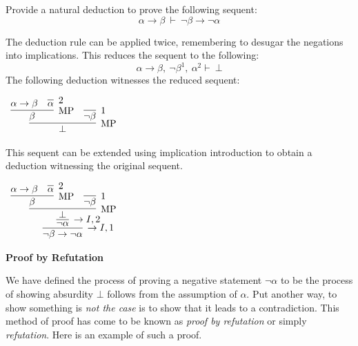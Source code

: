 \documentclass{book}
\begin{document}
    \begin{eg}[Contraposition]
        Provide a natural deduction to prove the following sequent: $$\alpha \to \beta \ \vdash \ \lnot\beta \to \lnot\alpha $$

        The deduction rule can be applied twice, remembering to desugar the negations into implications. This reduces the sequent to the following: $$\alpha \to \beta, \ \lnot\beta^{1}, \ \alpha^{2} \vdash \ \bot$$ The following deduction witnesses the reduced sequent: 

        \begin{center}
            $\begin{array}{c}
                \infer[\MP]{\bot}
                            {\infer[\MP]{\beta}
                                {\alpha \to \beta
                                &
                                \infer[2]{\alpha}{}}
                            &
                            \infer[1]{\lnot\beta}{}}
            \end{array}$
        \end{center}   
        
        This sequent can be extended using implication introduction to obtain a deduction witnessing the original sequent. 

        \begin{center}
            $\begin{array}{c}
                \infer[\to I,1]{\lnot\beta \to \lnot\alpha}
                    {\infer[\to I,2]{\lnot\alpha}
                        {\infer[\MP]{\bot}
                            {\infer[\MP]{\beta}
                                {\alpha \to \beta
                                &
                                \infer[2]{\alpha}{}}
                            &
                            \infer[1]{\lnot\beta}{}}}}
            \end{array}$
        \end{center}
    \end{eg}

    \begin{center}
        {\bf Proof by Refutation}
    \end{center}

    We have defined the process of proving a negative statement $\lnot\alpha$ to be the process of showing absurdity $\bot$ follows from the assumption of $\alpha$. Put another way, to show something is \emph{not the case} is to show that it leads to a contradiction. This method of proof has come to be known as \emph{proof by refutation} or simply \emph{refutation}. Here is an example of such a proof. 
\end{document}
